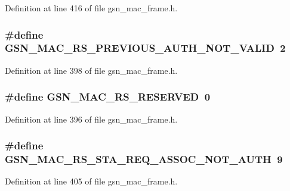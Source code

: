 Definition at line 416 of file gsn\_\-mac\_\-frame.h.

\hypertarget{a00523_a3566113862cc56e6a6103a8f414c708e}{
\subsubsection[{GSN\_\-MAC\_\-RS\_\-PREVIOUS\_\-AUTH\_\-NOT\_\-VALID}]{\setlength{\rightskip}{0pt plus 5cm}\#define GSN\_\-MAC\_\-RS\_\-PREVIOUS\_\-AUTH\_\-NOT\_\-VALID~2}}
\label{a00523_a3566113862cc56e6a6103a8f414c708e}


Definition at line 398 of file gsn\_\-mac\_\-frame.h.

\hypertarget{a00523_ae4ae037b447de8e12b10f58f9c3e9263}{
\subsubsection[{GSN\_\-MAC\_\-RS\_\-RESERVED}]{\setlength{\rightskip}{0pt plus 5cm}\#define GSN\_\-MAC\_\-RS\_\-RESERVED~0}}
\label{a00523_ae4ae037b447de8e12b10f58f9c3e9263}


Definition at line 396 of file gsn\_\-mac\_\-frame.h.

\hypertarget{a00523_a991360dfc5569fca86b361314d292f0b}{
\subsubsection[{GSN\_\-MAC\_\-RS\_\-STA\_\-REQ\_\-ASSOC\_\-NOT\_\-AUTH}]{\setlength{\rightskip}{0pt plus 5cm}\#define GSN\_\-MAC\_\-RS\_\-STA\_\-REQ\_\-ASSOC\_\-NOT\_\-AUTH~9}}
\label{a00523_a991360dfc5569fca86b361314d292f0b}


Definition at line 405 of file gsn\_\-mac\_\-frame.h.

